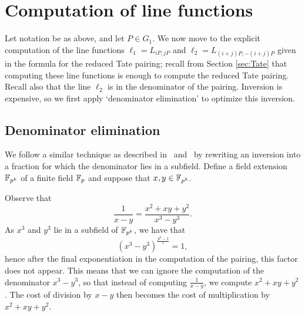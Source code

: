 \section{Computation of line functions}
\label{sec:formulas}

Let notation be as above, and let $P \in G_{1}$. We now move to the explicit computation of the line functions
$\ell_{1} = L_{iP,jP}$ and $\ell_{2} = L_{(i+j)P,-(i+j)P}$
given in the formula for the reduced Tate pairing; recall from Section \ref{sec:Tate} that computing these line functions is enough to compute the reduced Tate pairing. Recall also that the line $\ell_{2}$ is in the denominator of the pairing. Inversion is expensive, so we first apply `denominator elimination' to optimize this inversion.

%
%
%


\subsection{Denominator elimination}
We follow a similar technique as described in~\cite{2008/lin} and~\cite{2009/deg15}
by rewriting an inversion into a fraction for which the denominator lies in a subfield.
Define a field extension $\mathbb{F}_{p^k}$ of a finite field $\mathbb{F}_{p}$ and suppose that $x,y \in \mathbb{F}_{p^k}$.

Observe that
$$ \frac{1}{x-y} = \frac{x^2 + xy + y^2}{x^3 - y^3}. $$
As $x^3$ and $y^3$ lie in a subfield of $\mathbb{F}_{p^k}$, we have that
\[(x^{3} - y^{3})^{\frac{p^{k}-1}{r}} = 1,\]
hence after the final exponentiation in the computation of the pairing, this factor does not appear.
This means that we can ignore the computation of the denominator $x^3 - y^3$, so that instead of computing $\frac{1}{x-y}$,
we compute $x^2 + xy + y^2$.
The cost of division by $x - y$ then becomes the cost of multiplication by $x^2 + xy + y^2$.

